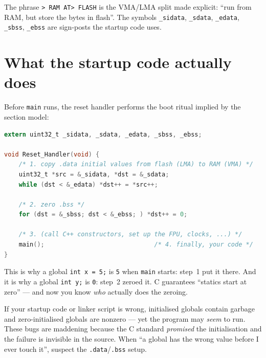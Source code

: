 \documentclass[11pt,a4paper,oneside]{book}
\newcommand{\code}[1]{\texttt{#1}}
\begin{document}
The phrase \code{> RAM AT> FLASH} is the VMA/LMA split made explicit: ``run from
RAM, but store the bytes in flash''. The symbols \code{\_sidata},
\code{\_sdata}, \code{\_edata}, \code{\_sbss}, \code{\_ebss} are sign-posts the
startup code uses.

\section{What the startup code actually does}
Before \code{main} runs, the reset handler performs the boot ritual implied by
the section model:
\begin{lstlisting}[language=C,caption={The essence of \code{Reset\_Handler}.}]
extern uint32_t _sidata, _sdata, _edata, _sbss, _ebss;

void Reset_Handler(void) {
    /* 1. copy .data initial values from flash (LMA) to RAM (VMA) */
    uint32_t *src = &_sidata, *dst = &_sdata;
    while (dst < &_edata) *dst++ = *src++;

    /* 2. zero .bss */
    for (dst = &_sbss; dst < &_ebss; ) *dst++ = 0;

    /* 3. (call C++ constructors, set up the FPU, clocks, ...) */
    main();                              /* 4. finally, your code */
}
\end{lstlisting}
This is why a global \code{int x = 5;} is \code{5} when \code{main} starts:
step~1 put it there. And it is why a global \code{int y;} is \code{0}: step~2
zeroed it. C guarantees ``statics start at zero'' --- and now you know
\emph{who} actually does the zeroing.

\begin{warning}
If your startup code or linker script is wrong, initialised globals contain
garbage and zero-initialised globals are nonzero --- yet the program may
\emph{seem} to run. These bugs are maddening because the C standard
\emph{promised} the initialisation and the failure is invisible in the source.
When ``a global has the wrong value before I ever touch it'', suspect the
\code{.data}/\code{.bss} setup.
\end{warning}
\end{document}
